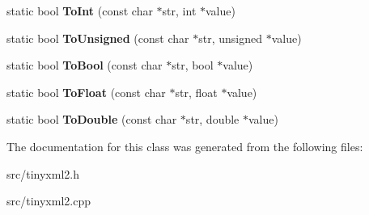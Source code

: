 \begin{DoxyCompactItemize}
\item 
static bool {\bfseries To\+Int} (const char $\ast$str, int $\ast$value)\hypertarget{classtinyxml2_1_1_x_m_l_util_ad4df4023d11ee3fca9689c49b9707323}{}\label{classtinyxml2_1_1_x_m_l_util_ad4df4023d11ee3fca9689c49b9707323}

\item 
static bool {\bfseries To\+Unsigned} (const char $\ast$str, unsigned $\ast$value)\hypertarget{classtinyxml2_1_1_x_m_l_util_a210c8637d5eb4ce3d4625294af0efc2f}{}\label{classtinyxml2_1_1_x_m_l_util_a210c8637d5eb4ce3d4625294af0efc2f}

\item 
static bool {\bfseries To\+Bool} (const char $\ast$str, bool $\ast$value)\hypertarget{classtinyxml2_1_1_x_m_l_util_ae5b03e0a1ca5d42052a7ac540f7aa12a}{}\label{classtinyxml2_1_1_x_m_l_util_ae5b03e0a1ca5d42052a7ac540f7aa12a}

\item 
static bool {\bfseries To\+Float} (const char $\ast$str, float $\ast$value)\hypertarget{classtinyxml2_1_1_x_m_l_util_a399e71edb5f29d61ea81d91ee0332bb9}{}\label{classtinyxml2_1_1_x_m_l_util_a399e71edb5f29d61ea81d91ee0332bb9}

\item 
static bool {\bfseries To\+Double} (const char $\ast$str, double $\ast$value)\hypertarget{classtinyxml2_1_1_x_m_l_util_ad8f75ac140fb19c1c6e164a957c4cd53}{}\label{classtinyxml2_1_1_x_m_l_util_ad8f75ac140fb19c1c6e164a957c4cd53}

\end{DoxyCompactItemize}


The documentation for this class was generated from the following files\+:\begin{DoxyCompactItemize}
\item 
src/tinyxml2.\+h\item 
src/tinyxml2.\+cpp\end{DoxyCompactItemize}
